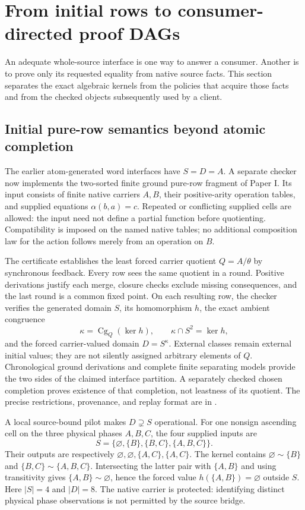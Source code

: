 \section{From initial rows to consumer-directed proof DAGs}\label{sec:consumerproofs}

An adequate whole-source interface is one way to answer a consumer. Another is to prove only its requested equality from native source facts. This section separates the exact algebraic kernels from the policies that acquire those facts and from the checked objects subsequently used by a client.

\subsection{Initial pure-row semantics beyond atomic completion}
The earlier atom-generated word interfaces have $S=D=A$. A separate checker now implements the two-sorted finite ground pure-row fragment of Paper I. Its input consists of finite native carriers $A,B$, their positive-arity operation tables, and supplied equations $\alpha(b,a)=c$. Repeated or conflicting supplied cells are allowed: the input need not define a partial function before quotienting. Compatibility is imposed on the named native tables; no additional composition law for the action follows merely from an operation on $B$.

The certificate establishes the least forced carrier quotient $Q=A/\theta$ by synchronous feedback. Every row sees the same quotient in a round. Positive derivations justify each merge, closure checks exclude missing consequences, and the last round is a common fixed point. On each resulting row, the checker verifies the generated domain $S$, its homomorphism $h$, the exact ambient congruence
\[
 \kappa=\operatorname{Cg}_{Q}(\ker h),\qquad
 \kappa\cap S^2=\ker h,
\]
and the forced carrier-valued domain $D=S^\kappa$. External classes remain external initial values; they are not silently assigned arbitrary elements of $Q$. Chronological ground derivations and complete finite separating models provide the two sides of the claimed interface partition. A separately checked chosen completion proves existence of that completion, not leastness of its quotient. The precise restrictions, provenance, and replay format are in .

A local source-bound pilot makes $D\supsetneq S$ operational. For one nonsign ascending cell on the three physical phases $A,B,C$, the four supplied inputs are
\[
 S=\{\varnothing,\{B\},\{B,C\},\{A,B,C\}\}.
\]
Their outputs are respectively $\varnothing,\varnothing,\{A,C\},\{A,C\}$. The kernel contains $\varnothing\sim\{B\}$ and $\{B,C\}\sim\{A,B,C\}$. Intersecting the latter pair with $\{A,B\}$ and using transitivity gives $\{A,B\}\sim\varnothing$, hence the forced value $h(\{A,B\})=\varnothing$ outside $S$. Here $|S|=4$ and $|D|=8$. The native carrier is protected: identifying distinct physical phase observations is not permitted by the source bridge.

